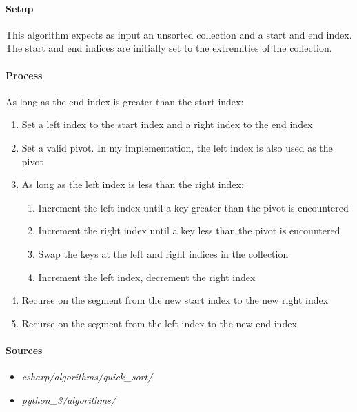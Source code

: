 \documentclass{article}
\begin{document}
{\paragraph{Setup}
This algorithm expects as input an unsorted collection and a start and end index. The start and end indices are
initially set to the extremities of the collection.

\paragraph{Process}
As long as the end index is greater than the start index:
\begin{enumerate}
\item{Set a left index to the start index and a right index to the end index}
\item{Set a valid pivot. In my implementation, the left index is also used as the pivot}
\item{As long as the left index is less than the right index:}
  \begin{enumerate}
  \item{Increment the left index until a key greater than the pivot is encountered}
  \item{Increment the right index until a key less than the pivot is encountered}
  \item{Swap the keys at the left and right indices in the collection}
  \item{Increment the left index, decrement the right index}
  \end{enumerate}
\item{Recurse on the segment from the new start index to the new right index}
\item{Recurse on the segment from the left index to the new end index}
\end{enumerate}

\begin{samepage}
  \paragraph{Sources}
  \begin{itemize}
  \item{{\em csharp/algorithms/quick\_sort/}}
  \item{{\em python\_3/algorithms/}}
  \end{itemize}
\end{samepage}

}
\end{document}
